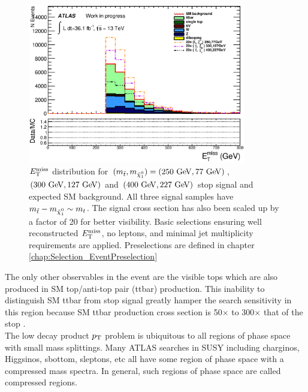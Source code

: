 \begin{figure}[h!]
\centering
    \includegraphics[width=0.85\textwidth]{figures/plotSR/SR_eT_miss_0SR.eps}\hspace{0.05\textwidth}
\caption[Stop signal with $m_{\stop}-m_{\ninoone} \sim m_t$ and SM background $\met$ distribution after loose preliminary selections for $\met>250 \gev$, zero leptons and at least four jets]{ $\met$ distribution for $(m_{\stop}, m_{\ninoone}) = (250 \gev,77 \gev)$, $(300 \gev, 127 \gev)$ and $(400 \gev, 227 \gev)$ stop signal and expected SM background.  All three signal samples have $m_{\stop}-m_{\ninoone} \sim m_t$.  The signal cross section has also been scaled up by a factor of 20 for better visibility.  Basic selections ensuring well reconstructed $\met$, no leptons, and minimal jet multiplicity requirements are applied.  Preselections are defined in chapter \ref{chap:Selection_EventPreselection} }
\label{fig:presel:MET_diag}
\end{figure}

\indent The only other observables in the event are the visible tops which are also produced in SM top/anti-top pair (ttbar) production.  This inability to distinguish SM ttbar from stop signal greatly hamper the search sensitivity in this region because SM ttbar production cross section is 50$\times$ to 300$\times$ that of the stop . \\

\indent The low decay product $p_{\mathrm{T}}$ problem is ubiquitous to all regions of phase space with small mass splittings.  Many ATLAS searches in SUSY including charginos, Higgsinos, sbottom, sleptons, etc all have some region of phase space with a compressed mass spectra.  In general, such regions of phase space are called compressed regions. \\

